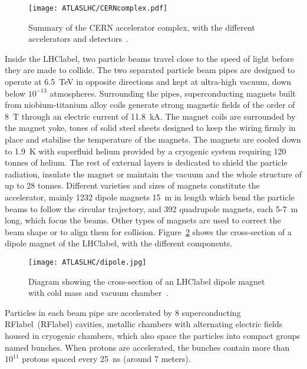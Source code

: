 \begin{figure}[htbp]
    \RawFloats
    \begin{center}
    \texttt{[image: ATLASLHC/CERNcomplex.pdf]}
    \caption{
        Summary of the CERN accelerator complex, with the different accelerators and detectors~\cite{CERNcomplex}. 
    }
    \label{figLHC:CERNcomplex}
    \end{center}
\end{figure}

Inside the \acrshort{LHClabel}, two particle beams travel close to the speed of light before they are made to collide. The two separated particle beam pipes are designed to operate at 6.5~TeV in opposite directions and kept at ultra-high vacuum, down below $10^{-13}$ atmospheres. Surrounding the pipes, superconducting magnets built from niobium-titanium alloy coils generate strong magnetic fields of the order of 8~T through an electric current of 11.8~kA. The magnet coils are surrounded by the magnet yoke, tones of solid steel sheets designed to keep the wiring firmly in place and stabilise the temperature of the magnets. The magnets are cooled down to 1.9~K with superfluid helium provided by a cryogenic system requiring 120 tonnes of helium. The rest of external layers is dedicated to shield the particle radiation, insulate the magnet or maintain the vacuum and the whole structure of up to 28 tonnes. Different varieties and sizes of magnets constitute the accelerator, mainly 1232 dipole magnets 15~m in length which bend the particle beams to follow the circular trajectory, and 392 quadrupole magnets, each 5-7~m long, which focus the beams. Other types of magnets are used to correct the beam shape or to align them for collision. Figure~\ref{figLHC:dipole} shows the cross-section of a dipole magnet of the \acrshort{LHClabel}, with the different components.

\begin{figure}[htbp]
    \RawFloats
    \begin{center}
    \texttt{[image: ATLASLHC/dipole.jpg]}
    \caption{
        Diagram showing the cross-section of an \acrshort{LHClabel} dipole magnet with cold mass and vacuum chamber~\cite{LHCdipole}. 
    }
    \label{figLHC:dipole}
    \end{center}
\end{figure}

Particles in each beam pipe are accelerated by 8 superconducting \acrlong{RFlabel}~(\acrshort{RFlabel}) cavities, metallic chambers with alternating electric fields housed in cryogenic chambers, which also space the particles into compact groups named bunches. When protons are accelerated, the bunches contain more than $10^{11}$ protons spaced every 25~ns (around 7 meters).

